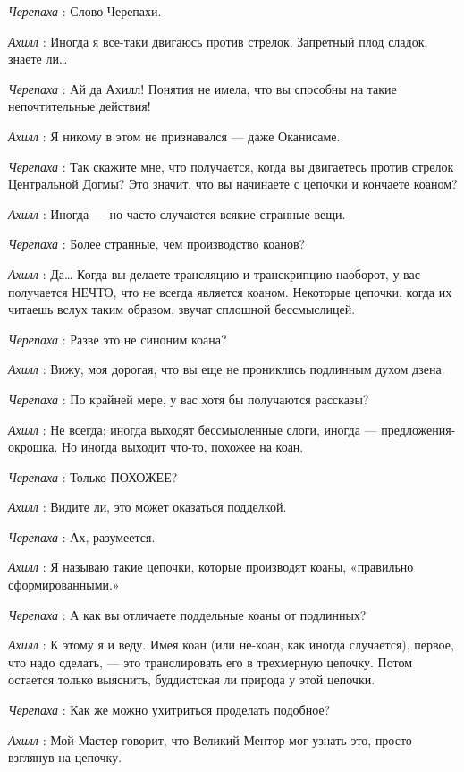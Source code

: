 \emph{Черепаха} : Слово Черепахи.

\emph{Ахилл} : Иногда я все-таки двигаюсь против стрелок. Запретный плод сладок, знаете ли\ldots{}

\emph{Черепаха} : Ай да Ахилл! Понятия не имела, что вы способны на такие непочтительные действия!

\emph{Ахилл} : Я никому в этом не признавался --- даже Оканисаме.

\emph{Черепаха} : Так скажите мне, что получается, когда вы двигаетесь против стрелок Центральной Догмы? Это значит, что вы начинаете с цепочки и кончаете коаном?

\emph{Ахилл} : Иногда --- но часто случаются всякие странные вещи.

\emph{Черепаха} : Более странные, чем производство коанов?

\emph{Ахилл} : Да\ldots{} Когда вы делаете трансляцию и транскрипцию наоборот, у вас получается НЕЧТО, что не всегда является коаном. Некоторые цепочки, когда их читаешь вслух таким образом, звучат сплошной бессмыслицей.

\emph{Черепаха} : Разве это не синоним коана?

\emph{Ахилл} : Вижу, моя дорогая, что вы еще не прониклись подлинным духом дзена.

\emph{Черепаха} : По крайней мере, у вас хотя бы получаются рассказы?

\emph{Ахилл} : Не всегда; иногда выходят бессмысленные слоги, иногда --- предложения-окрошка. Но иногда выходит что-то, похожее на коан.

\emph{Черепаха} : Только ПОХОЖЕЕ?

\emph{Ахилл} : Видите ли, это может оказаться подделкой.

\emph{Черепаха} : Ах, разумеется.

\emph{Ахилл} : Я называю такие цепочки, которые производят коаны, «правильно сформированными.»

\emph{Черепаха} : А как вы отличаете поддельные коаны от подлинных?

\emph{Ахилл} : К этому я и веду. Имея коан (или не-коан, как иногда случается), первое, что надо сделать, --- это транслировать его в трехмерную цепочку. Потом остается только выяснить, буддистская ли природа у этой цепочки.

\emph{Черепаха} : Как же можно ухитриться проделать подобное?

\emph{Ахилл} : Мой Мастер говорит, что Великий Ментор мог узнать это, просто взглянув на цепочку.

